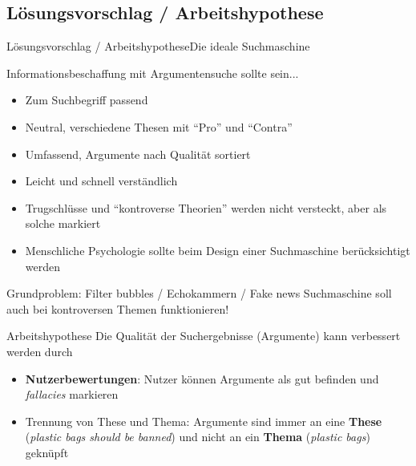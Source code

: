 \documentclass{beamer}
\begin{document}
	\subsection{Lösungsvorschlag / Arbeitshypothese}
	\begin{frame}{Lösungsvorschlag / Arbeitshypothese}{Die ideale Suchmaschine}
		\begin{block}{Informationsbeschaffung mit Argumentensuche sollte sein...}
			\begin{itemize}
				\item Zum Suchbegriff passend
				\item Neutral, verschiedene Thesen mit ``Pro'' und ``Contra''
				\item Umfassend, Argumente nach Qualität sortiert
				\item Leicht und schnell verständlich
				\item Trugschlüsse und ``kontroverse Theorien'' werden nicht versteckt, aber als solche markiert
				\item Menschliche Psychologie sollte beim Design einer Suchmaschine berücksichtigt werden
			\end{itemize}
		\end{block}
		\begin{block}{Grundproblem: Filter bubbles / Echokammern / Fake news}
			Suchmaschine soll auch bei kontroversen Themen funktionieren!
		\end{block}
	\end{frame}

	\begin{frame}{Arbeitshypothese}
		Die Qualität der Suchergebnisse (Argumente) kann verbessert werden durch
		\begin{itemize}[<+->]
			\item \textbf{Nutzerbewertungen}: Nutzer können Argumente als gut befinden und \textit{fallacies} markieren
			\item Trennung von These und Thema: Argumente sind immer an eine \textbf{These} (\textit{plastic bags should be banned}) und nicht an ein \textbf{Thema} (\textit{plastic bags}) geknüpft
		\end{itemize}
	\end{frame}
\end{document}
